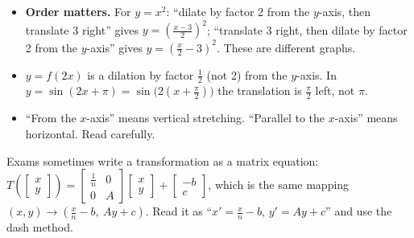 \begin{warn}
\begin{itemize}
  \item \textbf{Order matters.} For $y=x^2$: ``dilate by factor 2 from the $y$-axis, then translate 3 right'' gives $y=\left(\frac{x-3}{2}\right)^2$; ``translate 3 right, then dilate by factor 2 from the $y$-axis'' gives $y=\left(\frac{x}{2}-3\right)^2$. These are different graphs.
  \item $y=f(2x)$ is a dilation by factor $\frac12$ (not 2) from the $y$-axis. In $y=\sin(2x+\pi)=\sin\!\big(2\left(x+\frac{\pi}{2}\right)\big)$ the translation is $\frac{\pi}{2}$ left, not $\pi$.
  \item ``From the $x$-axis'' means vertical stretching. ``Parallel to the $x$-axis'' means horizontal. Read carefully.
\end{itemize}
\end{warn}

\begin{cas}
Exams sometimes write a transformation as a matrix equation:
$T\!\left(\begin{bmatrix}x\\y\end{bmatrix}\right)=\begin{bmatrix}\frac1n&0\\0&A\end{bmatrix}\begin{bmatrix}x\\y\end{bmatrix}+\begin{bmatrix}-b\\c\end{bmatrix}$, which is the same mapping $(x,y)\to\left(\frac xn-b,\ Ay+c\right)$. Read it as ``$x'=\frac{x}{n}-b$, $y'=Ay+c$'' and use the dash method.
\end{cas}

